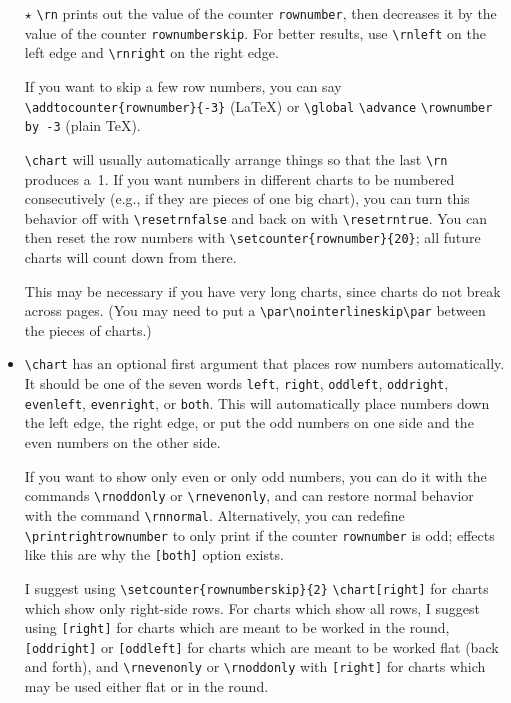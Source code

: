 \documentclass[draft]{amsart}
\begin{document}
\begin{itemize}

\item[$\star$] \verb|\rn| prints out the value of the counter
\verb|rownumber|, then decreases it by the value of the counter
\texttt{rownumberskip}.
For better results, use \verb|\rnleft| on the left edge and \verb|\rnright| on
the right edge.

If you want to skip a few row numbers, you can say
\verb|\addtocounter|\allowbreak\verb|{rownumber}{-3}| (\LaTeX) or \verb|\global|
\verb|\advance| \verb|\rownumber| \verb|by -3| (plain \TeX).

\verb|\chart| will usually automatically arrange things so that the
last \verb|\rn| produces a~1. If you want numbers in different charts
to be numbered consecutively (e.g., if they are pieces of one big
chart), you can turn this behavior off with \verb|\resetrnfalse| and
back on with \verb|\resetrntrue|. You can then reset the row numbers
with \verb|\setcounter{rownumber}{20}|; all future charts will count
down from there.

This may be necessary if you have very long charts, since charts do not break across pages. (You may need to put a \verb|\par\nointerlineskip\par| between the pieces of charts.)

\item \verb|\chart| has an optional first argument that places row numbers automatically. It should be one of the seven words \texttt{left}, \texttt{right}, \texttt{oddleft}, \texttt{oddright}, \texttt{evenleft}, \texttt{evenright}, or \texttt{both}. This will automatically place numbers down the left edge, the right edge, or put the odd numbers on one side and the even numbers on the other side.

If you want to show only even or only odd numbers, you can do it with the commands \verb|\rnoddonly| or \verb|\rnevenonly|, and can restore normal behavior with the command \verb|\rnnormal|. Alternatively, you can redefine \verb|\printrightrownumber| to only print if the counter \texttt{rownumber} is odd; effects like this are why the \texttt{[both]} option exists.

I suggest using \verb|\setcounter{rownumberskip}{2}| \verb|\chart[right]| for charts which show only right-side rows. For charts which show all rows, I suggest using \verb|[right]| for charts which are meant to be worked in the round, \verb|[oddright]| or \verb|[oddleft]| for charts which are meant to be worked flat (back and forth), and \verb|\rnevenonly| or \verb|\rnoddonly| with \verb|[right]| for charts which may be used either flat or in the round.


\end{itemize}
\end{document}
